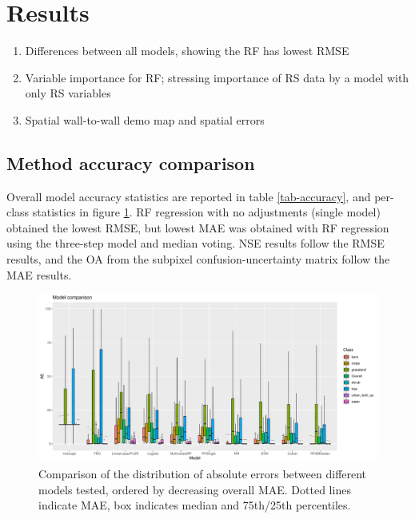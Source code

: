\documentclass[a4paper,10pt]{article}
\begin{document}
\section{Results}

\begin{enumerate}
 \item Differences between all models, showing the RF has lowest RMSE
 \item Variable importance for RF; stressing importance of RS data by a model with only RS variables
 \item Spatial wall-to-wall demo map and spatial errors
\end{enumerate}

\subsection{Method accuracy comparison}

Overall model accuracy statistics are reported in table \ref{tab-accuracy}, and per-class statistics in figure \ref{fig-models}.
\Gls{RF} regression with no adjustments (single model) obtained the lowest \gls{RMSE}, but lowest \gls{MAE} was obtained with \gls{RF} regression using the three-step model and median voting.
\gls{NSE} results follow the \gls{RMSE} results, and the \gls{OA} from the subpixel confusion-uncertainty matrix follow the \gls{MAE} results.

\begin{figure}
    \includegraphics[width=\textwidth]{article-figures/boxplots/2020-05-08-model-comparison-bar}
    \caption{Comparison of the distribution of absolute errors between different models tested, ordered by decreasing overall \gls{MAE}. Dotted lines indicate \gls{MAE}, box indicates median and 75th/25th percentiles.}
    \label{fig-models}
\end{figure}
\end{document}
